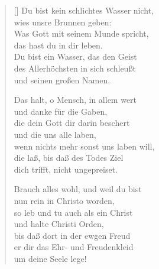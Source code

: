 \begin{multicols}{2}
\begin{verse}[\versewidth]
 Du bist kein schlichtes Wasser nicht,\\
wies unsre Brunnen geben:\\
Was Gott mit seinem Munde spricht,\\
das hast du in dir leben.\\
Du bist ein Wasser, das den Geist\\
des Allerhöchsten in sich schleußt\\
und seinen großen Namen.

 Das halt, o Mensch, in allem wert\\
und danke für die Gaben,\\
die dein Gott dir darin beschert\\
und die uns alle laben,\\
wenn nichts mehr sonst uns laben will,\\
die laß, bis daß des Todes Ziel\\
dich trifft, nicht ungepreiset.

 Brauch alles wohl, und weil du bist\\
nun rein in Christo worden,\\
so leb und tu auch als ein Christ\\
und halte Christi Orden,\\
bis daß dort in der ewgen Freud\\
er dir das Ehr- und Freudenkleid\\
um deine Seele lege!

\end{verse}
\end{multicols}

